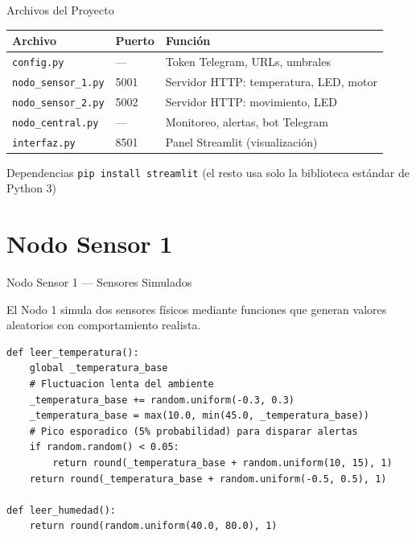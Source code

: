 \documentclass[aspectratio=169]{beamer}
\begin{document}
\begin{frame}{Archivos del Proyecto}

\begin{center}
\begin{tabular}{lll}
\toprule
\textbf{Archivo} & \textbf{Puerto} & \textbf{Funci\'on} \\
\midrule
\texttt{config.py}         & ---    & Token Telegram, URLs, umbrales \\
\texttt{nodo\_sensor\_1.py} & 5001   & Servidor HTTP: temperatura, LED, motor \\
\texttt{nodo\_sensor\_2.py} & 5002   & Servidor HTTP: movimiento, LED \\
\texttt{nodo\_central.py}  & ---    & Monitoreo, alertas, bot Telegram \\
\texttt{interfaz.py}       & 8501   & Panel Streamlit (visualizaci\'on) \\
\bottomrule
\end{tabular}
\end{center}

\vspace{0.5em}
\begin{block}{Dependencias}
\texttt{pip install streamlit} \quad (el resto usa solo la biblioteca est\'andar de Python 3)
\end{block}
\end{frame}

\section{Nodo Sensor 1}

\begin{frame}[fragile]{Nodo Sensor 1 --- Sensores Simulados}

El Nodo 1 simula dos sensores f\'isicos mediante funciones que generan valores aleatorios
con comportamiento realista.

\vspace{0.3em}
\begin{lstlisting}
def leer_temperatura():
    global _temperatura_base
    # Fluctuacion lenta del ambiente
    _temperatura_base += random.uniform(-0.3, 0.3)
    _temperatura_base = max(10.0, min(45.0, _temperatura_base))
    # Pico esporadico (5% probabilidad) para disparar alertas
    if random.random() < 0.05:
        return round(_temperatura_base + random.uniform(10, 15), 1)
    return round(_temperatura_base + random.uniform(-0.5, 0.5), 1)

def leer_humedad():
    return round(random.uniform(40.0, 80.0), 1)
\end{lstlisting}
\end{frame}
\end{document}
